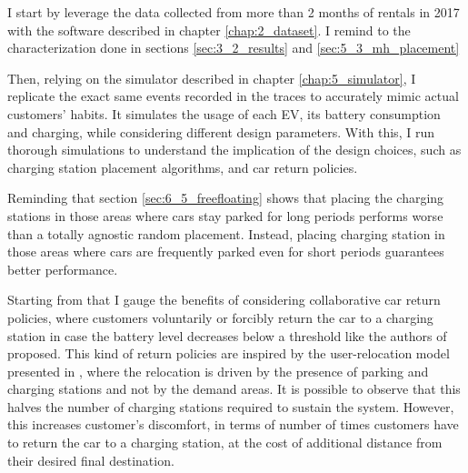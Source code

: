 
I start by leverage the data collected from more than 2 months of rentals in 2017 with the software described in chapter \ref{chap:2_dataset}. I remind to the characterization done in sections \ref{sec:3_2_results} and \ref{sec:5_3_mh_placement}

Then, relying on the simulator described in chapter \ref{chap:5_simulator}, I replicate the exact same events recorded in the traces to accurately mimic actual customers' habits. It simulates the usage of each EV, its battery consumption and charging, while considering different design parameters. With this, I run thorough simulations to understand the implication of the design choices, such as charging station placement algorithms, and car return policies.

Reminding that section \ref{sec:6_5_freefloating} shows that placing the charging stations in those areas where cars stay parked for long periods performs worse than a totally agnostic random placement. Instead, placing charging station in those areas where cars are frequently parked even for short periods guarantees  better performance.

Starting from that I gauge the benefits of considering collaborative car return policies, where customers voluntarily or forcibly return the car to a charging station in case the battery level decreases below a  threshold like the authors of \cite{2_FlathIlgWeinhardt_2012} proposed. This kind of return policies are inspired by the user-relocation model presented in \cite{1_BrendelBrennecke_2015, 6_BrendelLichtenberg_2017,7_BrendelRockenkamm_2015,8_Wagner2015DataAF}, where the relocation is driven by the presence of parking and charging stations and not by the demand areas.
It is possible to observe that this halves the number of charging stations required to sustain the system. However, this increases customer's discomfort, in terms of number of times customers have to return the car to a charging station, at the cost of additional distance from their desired final destination. 

